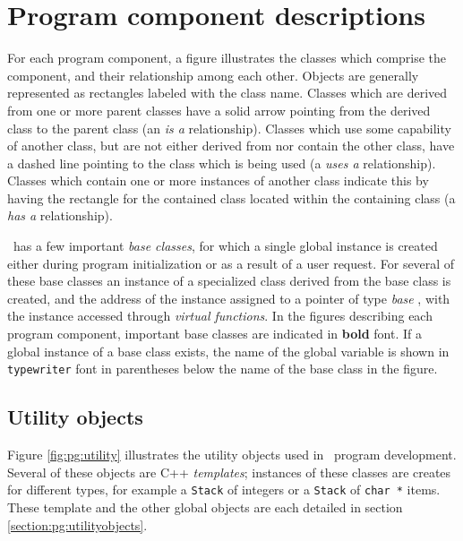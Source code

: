 \section{Program component descriptions}

For each program component, a figure illustrates the classes which
comprise the component, and their relationship among each other. 
Objects are generally represented as rectangles labeled with the
class name.  Classes which are derived from one or more parent
classes have a solid arrow pointing from the derived class to the
parent class (an {\em is a} relationship).  Classes which use some
capability of another class, but are not either derived from nor
contain the other class, have a dashed line pointing to the class
which is being used (a {\em uses a} relationship).  Classes which
contain one or more instances of another class indicate this by
having the rectangle for the contained class located within the
containing class (a {\em has a} relationship).

\VMD\ has a few important {\em base classes}, for which a single
global instance is created either during program initialization or as
a result of a user request.  For several of these base classes an
instance of a specialized class derived from the base class is
created, and the address of the instance assigned to a pointer of
type {\em base} {\tt *}, with the instance accessed through
{\em virtual functions}.  In the figures describing each program
component, important base classes are indicated in {\bf bold} font.
If a global instance of a base class exists, the name of the global
variable is shown in {\tt typewriter} font in parentheses below the
name of the base class in the figure.

\subsection{Utility objects}

Figure \ref{fig:pg:utility} illustrates the utility objects used in \VMD\ program development.  Several of these objects are C++ {\em templates}; instances of these classes are creates for different types, for example a {\tt Stack} of integers or a {\tt Stack} of {\tt char *} items.  These template and the other global objects are each detailed in section \ref{section:pg:utilityobjects}. 

\begin{centering}

\end{centering}

